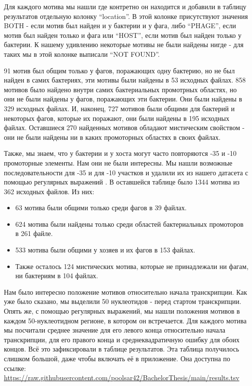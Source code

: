 \documentclass[14pt]{extarticle}
\begin{document}
    \par{Для каждого мотива мы нашли где контретно он находится и добавили в таблицу результатов
    отдельную колонку ``location''. В этой колонке присутствуют значения BOTH - если мотив был найден и у бактерии и у
    фага, либо ``PHAGE'', если мотив был найден только и фага или ``HOST'', если мотив был найден только у бактерии. К
    нашему удивлению некоторые мотивы не были найдены нигде - для таких мы в этой колонке выписали ``NOT FOUND''.}
    
    \par{91 мотив был общим только у фагов, поражающих одну бактерию, но не был найден в самих бактериях, эти мотивы 
    были найдены в 53 исходных файлах. 858 мотивов было найдено внутри самих бактериальных промотрных областях, но они 
    не были найдены у фагов, поражающих эти бактерии. Они были найдены в 329 исходных файлах. И, наконец, 727 мотивов 
    были общими для бактерий и некоторых фагов, которые их поражают, они были найдены в 195 исходных файлах.  Оставшиеся
    270 найденных мотивов обладают мистическим свойством - они не были найдены ни в каких промоторных областях в своих 
    файлах.}

\par{Также, мы знаем, что у бактерии и у хоста могут часто повторяются -35 и -10 промоторные элементы. Нам они не
    были интересны. Мы нашли возможные последовательности для -35 и для -10 участков \cite{-35,-10,-35-10,-35-10wiki} и 
    удалили их из нашего датасета с помощью регулярных выражений \cite{re}. В оставшейся таблице было 1344 мотива из 362
    исходных файлов. Из 
    них:} 
    
    \begin{itemize}
        \item 63 мотива были общими только среди фагов в 39 файлах.
        \item 624 мотива были найдены только среди областей бактериальных промоторов в 261 файле.
        \item 533 мотива были общими у хозяев и их фагов в 153 файлах.
        \item Также осталось 124 мистических мотива, которые не принадлежали ни фагам, ни бактериям в 104 файлах. 
    \end{itemize}
    
    \par{Нам было интересно положение мотивов относительно начала транскрипции. Как уже было сказано, мы выделили 50 
    нуклеотидов - перед стартом транскрипции. Опять же, с помощью регулярных выражений, мы нашли положения мотивов в
    каждом 50-нуклеотидном регионе, в котором он встречается. Для каждого мотива мы посчитали среднее значение для его
    левого конца относительно начала транскрипции, для его правого конца и среднеквадратичную ошибку для обоих
    концов. Всё это зафиксировали в таблице результатов. Эта таблица получилось слишком большой, даже чтобы включать её в приложение. Она доступна по ссылке:
    \url{https://raw.githubusercontent.com/poolsar42/BachelorThesis/main/results.tsv}}
\end{document}
